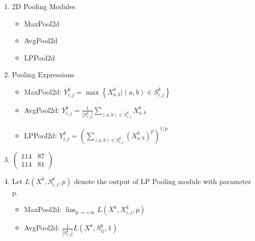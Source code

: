 \documentclass{article}
\begin{document}
\begin{enumerate}
    \item 2D Pooling Modules
    \begin{itemize}
        \item MaxPool2d
        \item AvgPool2d
        \item LPPool2d
    \end{itemize}
    \item Pooling Expressions
    \begin{itemize}
        \item MaxPool2d: $Y_{i, j}^{k}=\max \left\{X_{a, b}^{k} |(a, b) \in S_{i, j}^{k}\right\}$
        \item AvgPool2d: $Y_{i, j}^{k}=\frac{1}{\left|S_{i, j}^{k}\right|} \sum_{(a, b) \in S_{i, j}^{k}} X_{a, b}^{k}$
        \item LPPool2d: $Y_{i, j}^{k}=\left(\sum_{(a, b) \in S_{i, j}^{k}}\left(X_{a, b}^{k}\right)^{p}\right)^{1 / p}$
    \end{itemize}
    \item $\left(\begin{array}{ll}114 & 87 \\ 114 & 81\end{array}\right)$
    \item Let $L(X^k, S_{i, j}^k, p)$ denote the output of LP Pooling module with parameter p.
    \begin{itemize}
        \item MaxPool2d: $\lim _{p \rightarrow+\infty} L\left(X^{k}, X_{i, j}^{k}, p\right)$
        \item AvgPool2d: $\frac{1}{\left|S_{i, j}^{k}\right|} L\left(X^{k}, S_{i j}^{k}, 1\right)$
    \end{itemize}

\end{enumerate}
\end{document}
